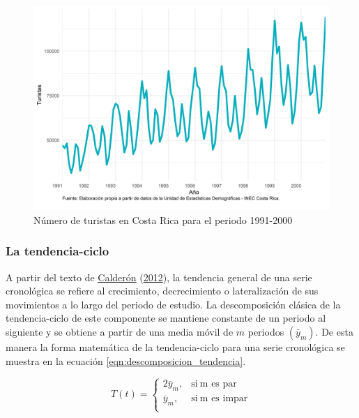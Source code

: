 \documentclass[
]{article}
\begin{document}
\begin{figure}[H]
\includegraphics[width=1\linewidth,height=1\textheight]{Tesis_files/figure-latex/ejemplo_multiplicativa-1} \caption{Número de turistas en Costa Rica para el periodo 1991-2000}\label{fig:ejemplo_multiplicativa}
\end{figure}

\subsubsection{La tendencia-ciclo}

A partir del texto de
\protect\hyperlink{ref-calderon2012estadistica}{Calderón}
(\protect\hyperlink{ref-calderon2012estadistica}{2012}), la tendencia
general de una serie cronológica se refiere al crecimiento,
decrecimiento o lateralización de sus movimientos a lo largo del periodo
de estudio. La descomposición clásica de la tendencia-ciclo de este
componente se mantiene constante de un periodo al siguiente y se obtiene
a partir de una media móvil de \(m\) periodos
\(\left(\bar y_{m}\right)\). De esta manera la forma matemática de la
tendencia-ciclo para una serie cronológica se muestra en la ecuación
\ref{eqn:descomposicion_tendencia}.

\begin{equation}
\label{eqn:descomposicion_tendencia}
T(t)=
\begin{cases}
2\bar y_{m}, & \text{si}\ \text{m es par} \\
\bar y_{m}, & \text{si}\ \text{m es impar} \\
\end{cases}
\end{equation}
\end{document}
